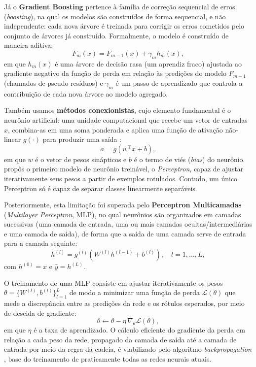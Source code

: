 Já o \textbf{Gradient Boosting} \cite{friedman2001greedy} pertence à família de correção sequencial de erros (\textit{boosting}), na qual os modelos são construídos de forma sequencial, e não independente: cada nova árvore é treinada para corrigir os erros cometidos pelo conjunto de árvores já construído. Formalmente, o modelo é construído de maneira aditiva:
\begin{equation}
F_m(x) = F_{m-1}(x) + \gamma_m h_m(x),
\end{equation}
em que $h_m(x)$ é uma árvore de decisão rasa (um aprendiz fraco) ajustada ao gradiente negativo da função de perda em relação às predições do modelo $F_{m-1}$ (chamados de pseudo-resíduos) e $\gamma_m$ é um passo de aprendizado que controla a contribuição de cada nova árvore ao modelo agregado.

Também usamos \textbf{métodos conexionistas}, cujo elemento fundamental é o neurônio artificial: uma unidade computacional que recebe um vetor de entradas $x$, combina-as em uma soma ponderada e aplica uma função de ativação não-linear $g(\cdot)$ para produzir uma saída \cite{mcculloch1943logical}:
\begin{equation}
a = g\left(w^\top x + b\right),
\end{equation}
em que $w$ é o vetor de pesos sinápticos e $b$ é o termo de viés (\textit{bias}) do neurônio. \citet{rosenblatt1958perceptron} propôs o primeiro modelo de neurônio treinável, o \textit{Perceptron}, capaz de ajustar iterativamente seus pesos a partir de exemplos rotulados. Contudo, um único Perceptron só é capaz de separar classes linearmente separáveis.

Posteriormente, esta limitação foi superada pelo \textbf{Perceptron Multicamadas} (\textit{Multilayer Perceptron}, MLP), no qual neurônios são organizados em camadas sucessivas (uma camada de entrada, uma ou mais camadas ocultas/intermediárias e uma camada de saída), de forma que a saída de uma camada serve de entrada para a camada seguinte:
\begin{equation}
h^{(l)} = g^{(l)}\left(W^{(l)} h^{(l-1)} + b^{(l)}\right), \quad l = 1, \ldots, L,
\end{equation}
com $h^{(0)} = x$ e $\hat{y} = h^{(L)}$.

O treinamento de uma MLP consiste em ajustar iterativamente os pesos $\theta = \{W^{(l)}, b^{(l)}\}_{l=1}^{L}$ de modo a minimizar uma função de perda $\mathcal{L}(\theta)$ que mede a discrepância entre as predições da rede e os rótulos esperados, por meio de descida de gradiente:
\begin{equation}
\theta \leftarrow \theta - \eta \, \nabla_{\theta} \mathcal{L}(\theta),
\end{equation}
em que $\eta$ é a taxa de aprendizado. O cálculo eficiente do gradiente da perda em relação a cada peso da rede, propagado da camada de saída até a camada de entrada por meio da regra da cadeia, é viabilizado pelo algoritmo \textit{backpropagation} \cite{rumelhart1986learning}, base do treinamento de praticamente todas as redes neurais atuais.

